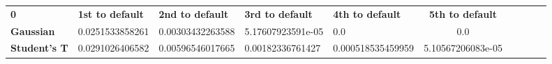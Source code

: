 \begin{center}
 \begin{tabular}{|l|l|l|l|l|c|c|c|c|c|}
\hline
\textbf{0} & \textbf{1st to default} & \textbf{2nd to default} & \textbf{3rd to default} & \textbf{4th to default} & \textbf{5th to default}\\\hhline{|=|=|=|=|=|=|}
\textbf{Gaussian} & 0.0251533858261 & 0.00303432263588 & 5.17607923591e-05 & 0.0 & 0.0\\
\textbf{Student's T} & 0.0291026406582 & 0.00596546017665 & 0.00182336761427 & 0.000518535459959 & 5.10567206083e-05\\
\hline
\end{tabular}
\end{center}